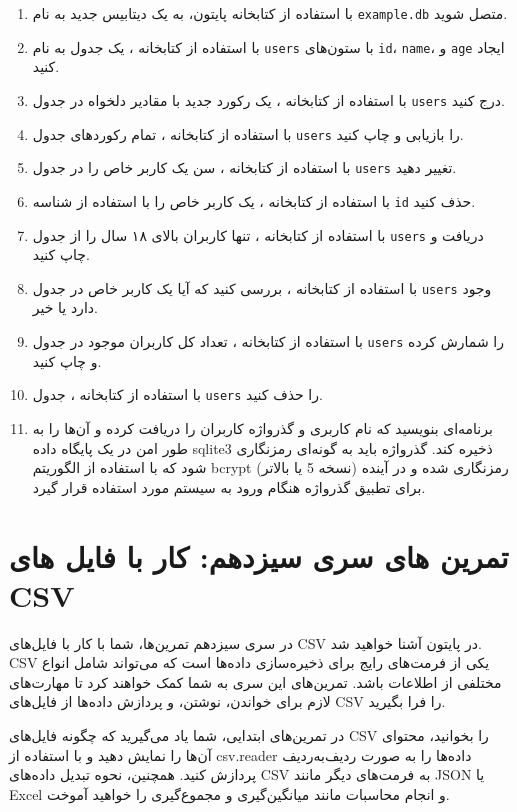 \documentclass[b5paper,12pt]{article}
\begin{document}
	\begin{enumerate}
		\item با استفاده از کتابخانه  پایتون، به یک دیتابیس جدید به نام \texttt{example.db} متصل شوید.
		\item با استفاده از کتابخانه ، یک جدول به نام \texttt{users} با ستون‌های \texttt{id}، \texttt{name}، و \texttt{age} ایجاد کنید.
		\item با استفاده از کتابخانه ، یک رکورد جدید با مقادیر دلخواه در جدول \texttt{users} درج کنید.
		\item با استفاده از کتابخانه ، تمام رکوردهای جدول \texttt{users} را بازیابی و چاپ کنید.
		\item با استفاده از کتابخانه ، سن یک کاربر خاص را در جدول \texttt{users} تغییر دهید.
		\item با استفاده از کتابخانه ، یک کاربر خاص را با استفاده از شناسه \texttt{id} حذف کنید.
		\item با استفاده از کتابخانه ، تنها کاربران بالای ۱۸ سال را از جدول \texttt{users} دریافت و چاپ کنید.
		\item با استفاده از کتابخانه ، بررسی کنید که آیا یک کاربر خاص در جدول \texttt{users} وجود دارد یا خیر.
		\item با استفاده از کتابخانه ، تعداد کل کاربران موجود در جدول \texttt{users} را شمارش کرده و چاپ کنید.
		\item با استفاده از کتابخانه ، جدول \texttt{users} را حذف کنید.
		\item برنامه‌ای بنویسید که نام کاربری و گذرواژه کاربران را دریافت کرده و آن‌ها را به طور امن در یک پایگاه داده sqlite3 ذخیره کند. گذرواژه باید به گونه‌ای رمزنگاری شود که با استفاده از الگوریتم bcrypt (نسخه 5 یا بالاتر) رمزنگاری شده و در آینده برای تطبیق گذرواژه هنگام ورود به سیستم مورد استفاده قرار گیرد.
	\end{enumerate}

	\newpage
	\section*{تمرین های سری سیزدهم: کار با فایل های CSV}
	در سری سیزدهم تمرین‌ها، شما با کار با فایل‌های CSV در پایتون آشنا خواهید شد. CSV یکی از فرمت‌های رایج برای ذخیره‌سازی داده‌ها است که می‌تواند شامل انواع مختلفی از اطلاعات باشد. تمرین‌های این سری به شما کمک خواهند کرد تا مهارت‌های لازم برای خواندن، نوشتن، و پردازش داده‌ها از فایل‌های CSV را فرا بگیرید.

	در تمرین‌های ابتدایی، شما یاد می‌گیرید که چگونه فایل‌های CSV را بخوانید، محتوای آن‌ها را نمایش دهید و با استفاده از csv.reader داده‌ها را به صورت ردیف‌به‌ردیف پردازش کنید. همچنین، نحوه تبدیل داده‌های CSV به فرمت‌های دیگر مانند JSON یا Excel و انجام محاسبات مانند میانگین‌گیری و مجموع‌گیری را خواهید آموخت.
\end{document}
